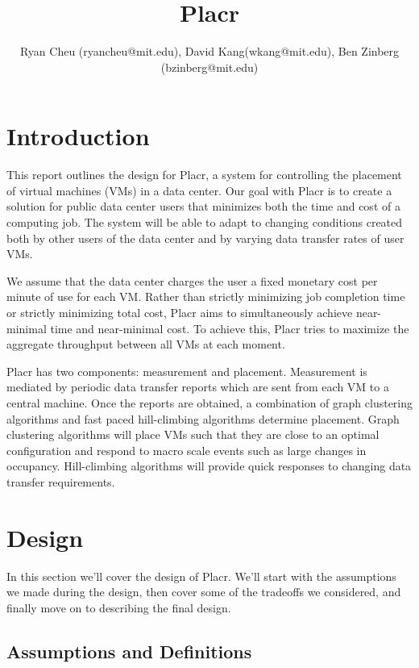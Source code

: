 \documentclass[11pt]{article}
\title{Placr}
\author{Ryan Cheu (ryancheu@mit.edu), David Kang(wkang@mit.edu), Ben Zinberg (bzinberg@mit.edu)}
\begin{document}
\begin{titlepage}

\maketitle

\end{titlepage}

\section{Introduction}

This report outlines the design for Placr, a system for controlling the placement of virtual machines (VMs) in a data center.  Our goal with Placr is to create a solution for public data center users that minimizes both the time and cost of a computing job.  The system will be able to adapt to changing conditions created both by other users of the data center and by varying data transfer rates of user VMs.

We assume that the data center charges the user a fixed monetary cost per minute of use for each VM.  Rather than strictly minimizing job completion time or strictly minimizing total cost, Placr aims to simultaneously achieve near-minimal time and near-minimal cost.  To achieve this, Placr tries to maximize the aggregate throughput between all VMs at each moment.

	Placr has two components: measurement and placement.  Measurement is mediated by periodic data transfer reports which are sent from each VM to a central machine.  Once the reports are obtained, a combination of graph clustering algorithms and fast paced hill-climbing algorithms determine placement. Graph clustering algorithms will place VMs such that they are close to an optimal configuration and respond to macro scale events such as large changes in occupancy.  Hill-climbing algorithms will provide quick responses to changing data transfer requirements.

\section{Design}

In this section we’ll cover the design of Placr.  We’ll start with the assumptions we made during the design, then cover some of the tradeoffs we considered, and finally move on to describing the final design.


\subsection{Assumptions and Definitions}
\end{document}

